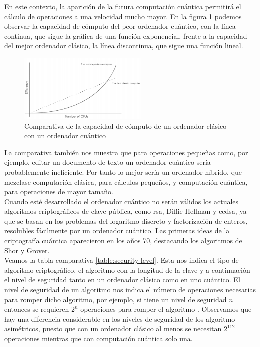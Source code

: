 En este contexto, la aparición de la futura computación cuántica permitirá el cálculo de operaciones a una velocidad mucho mayor. En la figura \ref{fig:comp-clasica-cuantica} podemos observar la capacidad de cómputo del peor ordenador cuántico, con la línea continua, que sigue la gráfica de una función exponencial, frente a la capacidad del mejor ordenador clásico, la línea discontinua, que sigue una función lineal.\\

\begin{figure}[H]
	\centering
	\includegraphics[width=0.55\textwidth]{figuras/comp_clasica_cuantica.png}
	\caption{Comparativa de la capacidad de cómputo de un ordenador clásico con un ordenador cuántico\cite{clasica-vs-cuantica}}
	\label{fig:comp-clasica-cuantica}
\end{figure}

La comparativa también nos muestra que para operaciones pequeñas como, por ejemplo, editar un documento de texto un ordenador cuántico sería probablemente ineficiente. Por tanto lo mejor sería un ordenador híbrido, que mezclase computación clásica, para cálculos pequeños, y computación cuántica, para operaciones de mayor tamaño.\\

Cuando esté desarrollado el ordenador cuántico no serán válidos los actuales algoritmos criptográficos de clave pública, como \acrshort{rsa}, Diffie-Hellman y \mbox{\acrshort{ecdsa}}, ya que se basan en los problemas del logaritmo discreto y factorización de enteros, resolubles fácilmente por un ordenador cuántico. Las primeras ideas de la criptografía cuántica aparecieron en los años 70, destacando los algoritmos de Shor y Grover.\\

Veamos la tabla comparativa \ref{table:security-level}. Esta nos indica el tipo de algoritmo criptográfico, el algoritmo con la longitud de la clave y a continuación el nivel de seguridad tanto en un ordenador clásico como en uno cuántico. El nivel de seguridad de un algoritmo nos indica el número de operaciones necesarias para romper dicho algoritmo, por ejemplo, si tiene un nivel de seguridad $n$ entonces se requieren $2^n$ operaciones para romper el algoritmo \cite{security-level}. Observamos que hay una diferencia considerable en los niveles de seguridad de los algoritmo asimétricos, puesto que con un ordenador clásico al menos se necesitan $2^{112}$ operaciones mientras que con computación cuántica solo una. \\

